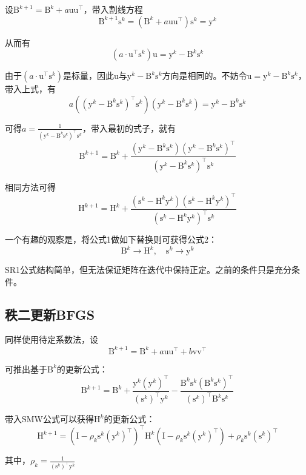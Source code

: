 \documentclass[a4paper]{D:/repositories/MyDGP/latex/PaperReadingLog}
\begin{document}
设$\mathrm{B}^{k+1}=\mathrm{B}^k+a\mathrm{u}\mathrm{u}^\top$，带入割线方程
$$
\mathrm{B}^{k+1}\mathrm{s}^k=(\mathrm{B}^k+a\mathrm{u}\mathrm{u}^\top)\mathrm{s}^k=\mathrm{y}^k
$$

从而有
$$
(a\cdot \mathrm{u}^\top \mathrm{s}^k)\mathrm{u}=\mathrm{y}^k-\mathrm{B}^k\mathrm{s}^k
$$

由于$(a\cdot \mathrm{u}^\top \mathrm{s}^k)$是标量，因此$\mathrm{u}$与$\mathrm{y}^k-\mathrm{B}^k\mathrm{s}^k$方向是相同的。不妨令$\mathrm{u}=\mathrm{y}^k-\mathrm{B}^k\mathrm{s}^k$，带入上式，有
$$
a((\mathrm{y}^k-\mathrm{B}^k\mathrm{s}^k)^\top \mathrm{s}^k)(\mathrm{y}^k-\mathrm{B}^k\mathrm{s}^k)=\mathrm{y}^k-\mathrm{B}^k\mathrm{s}^k
$$

可得$a=\frac{1}{(\mathrm{y}^k-\mathrm{B}^k\mathrm{s}^k)^\top \mathrm{s}^k}$，带入最初的式子，就有
$$
\mathrm{B}^{k+1}=\mathrm{B}^k+\frac{(\mathrm{y}^k-\mathrm{B}^k\mathrm{s}^k)(\mathrm{y}^k-\mathrm{B}^k\mathrm{s}^k)^\top}{(\mathrm{y}^k-\mathrm{B}^k\mathrm{s}^k)^\top \mathrm{s}^k}
$$

相同方法可得
$$
\mathrm{H}^{k+1}=\mathrm{H}^k+\frac{(\mathrm{s}^k-\mathrm{H}^k\mathrm{y}^k)(\mathrm{s}^k-\mathrm{H}^k\mathrm{y}^k)^\top}{(\mathrm{s}^k-\mathrm{H}^k\mathrm{y}^k)^\top \mathrm{s}^k}
$$

一个有趣的观察是，将公式1做如下替换则可获得公式2：
$$
\mathrm{B}^k\rightarrow\mathrm{H}^k,\quad \mathrm{s}^k\rightarrow \mathrm{y}^k
$$

SR1公式结构简单，但无法保证矩阵在迭代中保持正定。之前的条件只是充分条件。

\subsection{秩二更新BFGS}

同样使用待定系数法，设
$$
\mathrm{B}^{k+1}=\mathrm{B}^k+a\mathrm{u}\mathrm{u}^\top+b\mathrm{v}\mathrm{v}^\top
$$

可推出基于$\mathrm{B}^k$的更新公式：
$$
\mathrm{B}^{k+1}=\mathrm{B}^k+\frac{\mathrm{y}^k(\mathrm{y}^k)^\top}{(\mathrm{s}^k)^\top \mathrm{y}^k}-\frac{\mathrm{B}^k\mathrm{s}^k(\mathrm{B}^k\mathrm{s}^k)^\top}{(\mathrm{s}^k)^\top \mathrm{B}^k\mathrm{s}^k}
$$

带入SMW公式可以获得$\mathrm{H}^k$的更新公式：
$$
\mathrm{H}^{k+1}=(\mathrm{I}-\rho_k\mathrm{s}^k(\mathrm{y}^k)^\top)^\top\mathrm{H}^k(\mathrm{I}-\rho_k\mathrm{s}^k(\mathrm{y}^k)^\top)+\rho_k\mathrm{s}^k(\mathrm{s}^k)^\top
$$

其中，$\rho_k=\frac{1}{(\mathrm{s}^k)^\top \mathrm{y}^k}$
\end{document}
